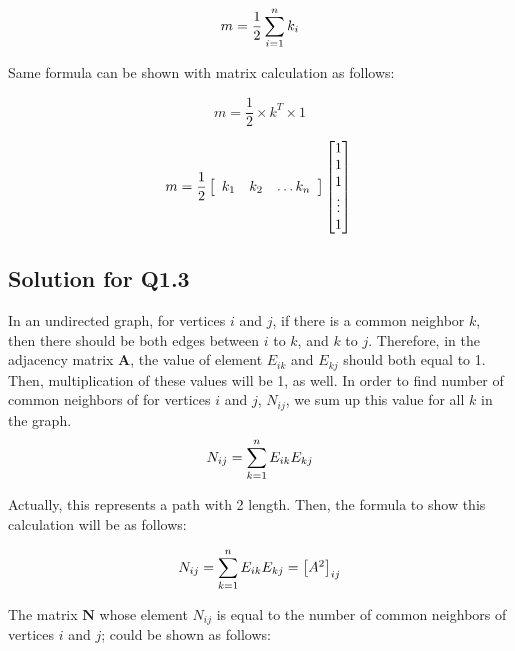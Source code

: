 \documentclass[11pt,a4,twocolumn]{article}
\theoremstyle{plain}
\theoremstyle{definition}
\theoremstyle{remark}
\begin{document}
\[
m= \frac{1}{2} \sum_{i=1}^n k_i\\
\]

\par
\noindent Same formula can be shown with matrix calculation as follows:   

\[
m = \frac{1}{2} \times k^{T} \times 1
\]

\[
m =  \frac{1}{2}
\left[
  \begin{array}{ccc}
	 k_{1} & k_{2} & \ldots   k_{n}  \\
  \end{array}
\right]
\begin{bmatrix}
           $1$ \\
           $1$ \\
           $1$ \\
           \vdots \\
           $1$ \\
\end{bmatrix} \\
\]

\subsection{Solution for Q1.3}

In an undirected graph, for vertices $i$ and $j$, if there is a common neighbor $k$, then there should be both edges between $i$ to $k$, and $k$ to $j$. Therefore, in the adjacency matrix $\mathbf{A}$, the value of element $E_{ik}$ and $E_{kj}$ should both equal to 1. Then, multiplication of these values will be 1, as well. In order to find number of common neighbors of for vertices $i$ and $j$,  $N_{ij}$, we sum up this value for all $k$ in the graph. 
\[
N_{ij}=  \sum_{k=1}^n E_{ik}E_{kj}\\
\]

\par
\noindent Actually, this represents a path with 2 length. Then, the formula to show this calculation will be as follows:

\[
N_{ij}=  \sum_{k=1}^n E_{ik}E_{kj}\\
= 
\begin{bmatrix}
 A^2 \\
\end{bmatrix}
_{ij}
\]

\par
\noindent The matrix $\mathbf{N}$ whose element $N_{ij}$ is equal to the number of common neighbors of vertices $i$
	and $j$; could be shown as follows:
\end{document}
